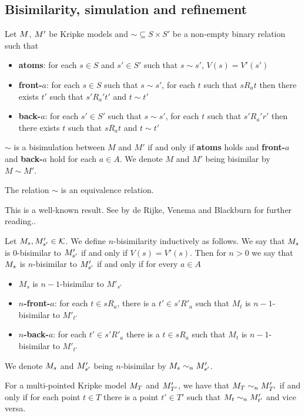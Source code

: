 \subsection{Bisimilarity, simulation and refinement}

\begin{defn} \label{bisimKripke}
	Let $M$, $M'$ be Kripke models and $\sim \subseteq S \times S'$ be a non-empty binary
	relation such that
	\begin{itemize}
		\item {\bf atoms}: for each $s \in S$ and $s' \in S'$ such that $s \sim s'$, $V(s) = V'(s')$
		\item {\bf front-$a$}: for each $s \in S$ such that $s \sim s'$, for each $t$ such that
		$s R_a t$ then there exists $t'$ such that $s' R_a' t'$ and $t \sim t'$
		\item {\bf back-$a$}: for each $s' \in S'$ such that $s \sim s'$, for each $t$ such that
		$s' R_a' r'$ then there exists $t$ such that $s R_a t$ and $t \sim t'$
	\end{itemize}
	$\sim$ is a bisimulation between $M$ and $M'$ if and only if {\bf atoms} holds and {\bf front-$a$}
	and {\bf back-$a$} hold for each $a \in A$.
	We denote $M$ and $M'$ being bisimilar by $M \sim M'$.
\end{defn}

\begin{lemma} \label{bisimEquivalence}
	The relation $\sim$ is an equivalence relation.
\end{lemma}

This is a well-known result.
See \cite{blackburn2002modal} by de Rijke, Venema and Blackburn for further reading..

\begin{defn} \label{nBisimKripke}
Let $M_s, M'_{s'} \in \mathcal{K}$.
We define $n$-bisimilarity inductively as follows.
We say that $M_s$ is $0$-bisimilar to $M'_{s'}$ if and only if $V(s) = V'(s)$.
Then for $n > 0$ we say that $M_s$ is $n$-bisimilar to $M'_{s'}$ if and only if for every $a \in A$
\begin{itemize}
	\item $M_s$ is $n-1$-bisimilar to $M'_{s'}$
	\item {\bf $n$-front-$a$}: for each $t \in s R_a$, there is a $t' \in s' R'_a$ such that $M_t$ is
	$n-1$-bisimilar to $M'_{t'}$
	\item {\bf $n$-back-$a$}: for each $t' \in s' R'_a$ there is a $t \in s R_a$ such that $M_t$ is
	$n-1$-bisimilar to $M'_{t'}$
\end{itemize}
We denote $M_s$ and $M'_{s'}$ being $n$-bisimilar by $M_s \sim_n
M'_{s'}$.
\end{defn}
For a multi-pointed Kripke model $M_T$ and $M'_{T'}$, we have that
$M_T \sim_n
M'_{T'}$ if and only if for each point $t \in T$ there is a point $t' \in T'$
such that $M_t \sim_n M'_{t'}$ and vice versa.

